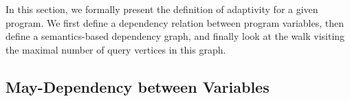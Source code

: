  In this section, we formally present the definition of adaptivity for a given program. We first define a dependency relation between program variables, then define a semantics-based dependency graph, and finally look at the walk visiting the maximal number of query vertices in this graph. 

\subsection{May-Dependency between Variables}
\label{sec:dep}
%
